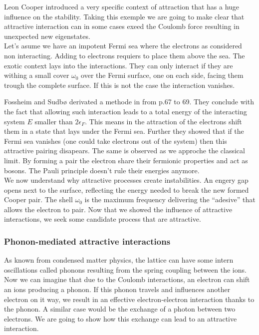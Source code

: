 \documentclass[../main.tex]{subfile}
\begin{document}
Leon Cooper introduced a very specific context of attraction that has a huge influence on the stability. Taking this exemple we are going
to make clear that attractive interaction can in some cases exeed the Coulomb force resulting in unexpected new eigenstates.\\

Let's asume we have an impotent Fermi sea where the electrons as considered non interacting. Adding to electrons requiers to place them
above the sea. The exotic context lays into the interactions. They can only interact if they are withing a small cover $\omega_0$
over the Fermi surface, one on each side, facing them trough the complete surface. If this is not the case the interaction vanishes.

Fossheim and Sudbø derivated a methode in \cite{FossheimSudbo2004} from p.67 to 69. They conclude with the fact that allowing such
interaction leads to a total energy of the interacting system $E$ smaller than $2 \epsilon_{F}$. This means in the attraction of the electrons
shift them in a state that lays under the Fermi sea. Further they showed that if the Fermi sea vanishes (one could take electrons out of the system) 
then this attractive pairing disapears. The same is observed as we approche the classical limit.
By forming a pair the electron share their fermionic properties and act as bosons. The Pauli principle doesn't rule their energies anymore.\\

We now understand why attractive processes create instabilities. An engery gap opens next to the surface,
reflecting the energy needed to break the new formed Cooper pair. The shell $\omega_0$ is the maximum frequency delivering
the ``adesive'' that allows the electron to pair.
Now that we showed the influence of attractive interactions, we seek some candidate process that are attractive.

\subsubsection{Phonon-mediated attractive interactions }
As known from condensed matter physics, the lattice can have some intern oscillations called phonons resulting from the spring coupling between the ions.
Now we can imagine that due to the Coulomb interactions, an electron can shift an ions producing a phonon. If this phonon travels and influences another electron
on it way, we result in an effective electron-electron interaction thanks to the phonon. A similar case would be the exchange of a photon between two electrons.
We are going to show how this exchange can lead to an attractive interaction.\\
\end{document}
